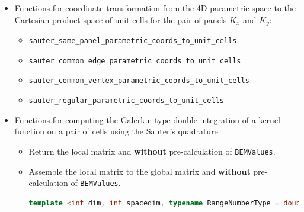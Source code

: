 \documentclass[11pt, a4paper]{article}
\begin{document}
\begin{itemize}
\item Functions for coordinate transformation from the 4D parametric space to the Cartesian product
  space of unit cells for the pair of panels $K_x$ and $K_y$:
  \begin{itemize}
  \item \texttt{sauter\_same\_panel\_parametric\_coords\_to\_unit\_cells}
  \item \texttt{sauter\_common\_edge\_parametric\_coords\_to\_unit\_cells}
  \item \texttt{sauter\_common\_vertex\_parametric\_coords\_to\_unit\_cells}
  \item \texttt{sauter\_regular\_parametric\_coords\_to\_unit\_cells}
  \end{itemize}
\item Functions for computing the Galerkin-type double integration of a kernel function on a pair of
  cells using the Sauter's quadrature
  \begin{itemize}
  \item Return the local matrix and \textbf{without} pre-calculation of \texttt{BEMValues}.
  \item Assemble the local matrix to the global matrix and \textbf{without} pre-calculation of \texttt{BEMValues}.
    \begin{lstlisting}[language=C++]
      template <int dim, int spacedim, typename RangeNumberType = double> void SauterQuadRule( FullMatrix<RangeNumberType> &system_matrix, const LaplaceKernel::KernelFunction<spacedim, RangeNumberType> & kernel_function, const typename DoFHandler<dim, spacedim>::cell_iterator &kx_cell_iter, const typename DoFHandler<dim, spacedim>::cell_iterator &ky_cell_iter, const MappingQGeneric<dim, spacedim> & kx_mapping = MappingQGeneric<dim, spacedim>(1), const MappingQGeneric<dim, spacedim> &ky_mapping = MappingQGeneric<dim, spacedim>(1))

\end{lstlisting}
\end{itemize}
\end{itemize}
\end{document}
